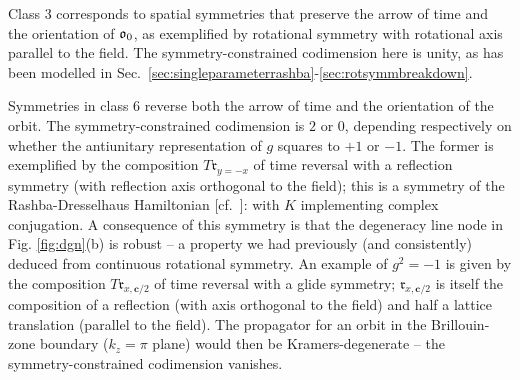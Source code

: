\documentclass[aps, prb, showpacs, twocolumn, notitlepage, superscriptaddress]{revtex4-1}
\begin{document}

Class 3 corresponds to spatial symmetries that preserve the arrow of time and the orientation of $\mathfrak{o}_0$, as exemplified by rotational symmetry with rotational axis parallel to the field. The symmetry-constrained codimension here is unity, as has been modelled in Sec.\ \ref{sec:singleparameterrashba}-\ref{sec:rotsymmbreakdown}.

Symmetries in class 6 reverse both the arrow of time and the orientation of the orbit. The symmetry-constrained codimension is $2$ or $0$, depending respectively on whether the antiunitary representation of $g$ squares to $+1$ or $-1$. The former is exemplified by the composition $T\mathfrak{r}_{y=-x}$ of time reversal with a reflection symmetry (with reflection axis orthogonal to the field); this is a symmetry of the Rashba-Dresselhaus Hamiltonian [cf.\ ]:
with $K$ implementing complex conjugation. A consequence of this symmetry is that the degeneracy line node in Fig. \ref{fig:dgn}(b) is robust -- a property we had previously (and consistently) deduced from continuous rotational symmetry. An example of $g^2{=}-1$ is given by
the composition $T\mathfrak{r}_{x,\boldsymbol{c}/2}$ of time reversal with a glide symmetry; $\mathfrak{r}_{x,\boldsymbol{c}/2}$ is itself the composition of a reflection (with axis orthogonal to the field) and half a lattice translation (parallel to the field). The propagator for an orbit in the Brillouin-zone boundary ($k_z{=}\pi$ plane) would then be Kramers-degenerate -- the symmetry-constrained codimension vanishes.




\end{document}
